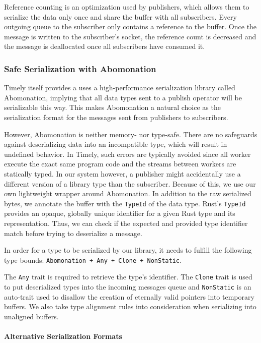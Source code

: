 Reference counting is an optimization used by publishers, which allows them to
serialize the data only once and share the buffer with all subscribers. Every
outgoing queue to the subscriber only contains a reference to the buffer. Once
the message is written to the subscriber's socket, the reference count is
decreased and the message is deallocated once all subscribers have consumed it.

\subsubsection{Safe Serialization with Abomonation}

Timely itself provides a uses a high-performance serialization library called
Abomonation, implying that all data types sent to a publish operator will be
serializable this way. This makes Abomonation a natural choice as the serialization
format for the messages sent from publishers to subscribers. 

However, Abomonation is neither memory- nor type-safe. There are no safeguards
against deserializing data into an incompatible type, which will result in undefined
behavior. In Timely, such errors are typically avoided since all worker
execute the exact same program code and the streams between workers are
statically typed. In our system however, a publisher might accidentally use
a different version of a library type than the subscriber. Because of this,
we use our own lightweight wrapper around Abomonation. In addition to the raw
serialized bytes, we annotate the buffer with the \lstinline{TypeId} of the
data type. Rust's \lstinline{TypeId} provides an opaque, globally unique
identifier for a given Rust type and its representation. Thus, we can check
if the expected and provided type identifier match before trying to deserialize
a message.

In order for a type to be serialized by our library, it needs to fulfill the
following type bounds: \lstinline{Abomonation + Any + Clone + NonStatic}.

The \lstinline{Any} trait is required to retrieve the type's identifier. The
\lstinline{Clone} trait is used to put deserialized types into the incoming
messages queue and \lstinline{NonStatic} is an auto-trait used to disallow the
creation of eternally valid pointers into temporary buffers. We also take type
alignment rules into consideration when serializing into unaligned buffers. 

\paragraph{Alternative Serialization Formats}

